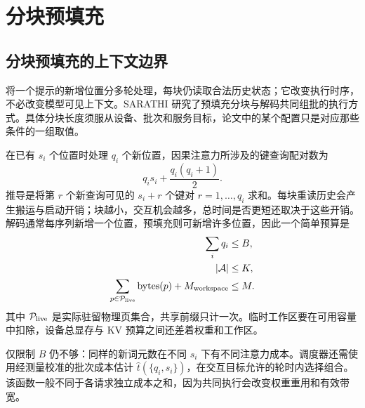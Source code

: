 \documentclass[../textbook.tex]{subfiles}
\begin{document}
\section{分块预填充}

\subsection{分块预填充的上下文边界}
将一个提示的新增位置分多轮处理，每块仍读取合法历史状态；它改变执行时序，不必改变模型可见上下文。SARATHI 研究了预填充分块与解码共同组批的执行方式\cite{agrawal2023sarathi}。具体分块长度须服从设备、批次和服务目标，论文中的某个配置只是对应那些条件的一组取值。

在已有 $s_i$ 个位置时处理 $q_i$ 个新位置，因果注意力所涉及的键查询配对数为
\begin{equation}
 q_i s_i+\frac{q_i(q_i+1)}2.
 \label{eq:schedule-pairs}
\end{equation}
推导是将第 $r$ 个新查询可见的 $s_i+r$ 个键对 $r=1,\ldots,q_i$ 求和。每块重读历史会产生搬运与启动开销；块越小，交互机会越多，总时间是否更短还取决于这些开销。解码通常每序列新增一个位置，预填充则可新增许多位置，因此一个简单预算是
\begin{equation}\label{eq:schedule-budgets}
 \begin{aligned}
  \sum_i q_i &\le B,\\
  |\mathcal A| &\le K,\\
  \sum_{p\in\mathcal P_{\rm live}}\operatorname{bytes}(p)+M_{\rm workspace} &\le M.
 \end{aligned}
\end{equation}
其中 $\mathcal P_{\rm live}$ 是实际驻留物理页集合，共享前缀只计一次。临时工作区要在可用容量中扣除，设备总显存与 KV 预算之间还差着权重和工作区。

仅限制 $B$ 仍不够：同样的新词元数在不同 $s_i$ 下有不同注意力成本。调度器还需使用经测量校准的批次成本估计 $\widehat t(\{q_i,s_i\})$，在交互目标允许的轮时内选择组合。该函数一般不同于各请求独立成本之和，因为共同执行会改变权重重用和有效带宽。
\end{document}
